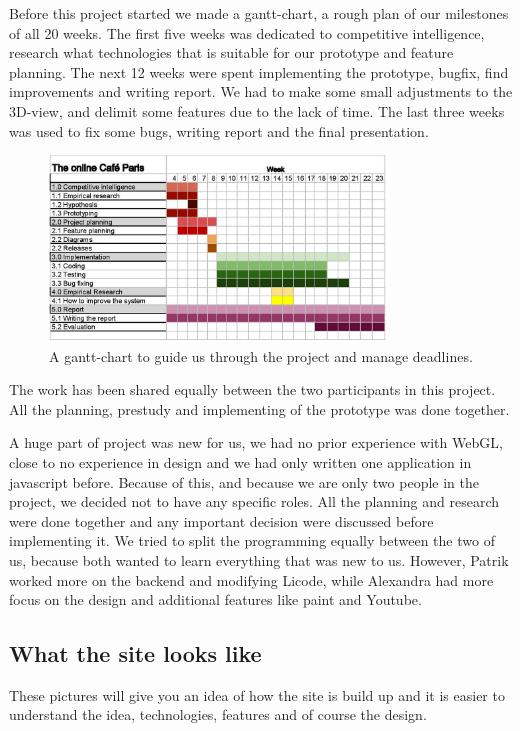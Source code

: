 \documentclass[12pt, titlepage]{article}
\begin{document}
Before this project started we made a gantt-chart, a rough plan of our milestones of all 20 weeks. The first five weeks was dedicated to competitive intelligence, research what technologies that is suitable for our prototype and feature planning. The next 12 weeks were spent implementing the prototype, bugfix, find improvements and writing report. We had to make some small adjustments to the 3D-view, and delimit some features due to the lack of time. The last three weeks was used to fix some bugs, writing report and the final presentation.
\begin{figure}[H]
  \centering
	\includegraphics[width=0.8\textwidth,keepaspectratio]{grovplanering.jpg}
  \caption{A gantt-chart to guide us through the project and manage deadlines.}
\end{figure}
The work has been shared equally between the two participants in this project. All the planning, prestudy and implementing of the prototype was done together.

A huge part of project was new for us, we had no prior experience with WebGL, close to no experience in design and we had only written one application in javascript before. Because of this, and because we are only two people in the project, we decided not to have any specific roles. All the planning and research were done together and any important decision were discussed before implementing it. We tried to split the programming equally between the two of us, because both wanted to learn everything that was new to us. However, Patrik worked more on the backend and modifying Licode, while Alexandra had more focus on the design and additional features like paint and Youtube.
\subsection{What the site looks like}
These pictures will give you an idea of how the site is build up and it is easier to understand the idea, technologies, features and of course the design.
\end{document}
